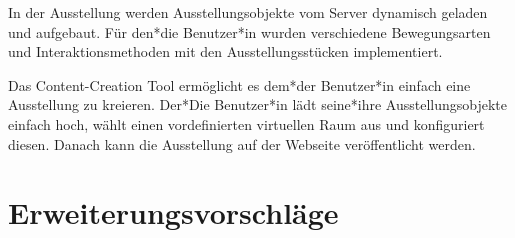 In der Ausstellung werden Ausstellungsobjekte vom Server dynamisch geladen und aufgebaut. Für den*die Benutzer*in wurden verschiedene Bewegungsarten und Interaktionsmethoden mit den Ausstellungsstücken implementiert.

Das Content-Creation Tool ermöglicht es dem*der Benutzer*in einfach eine Ausstellung zu kreieren. Der*Die Benutzer*in lädt seine*ihre Ausstellungsobjekte einfach hoch, wählt einen vordefinierten virtuellen Raum aus und konfiguriert diesen. Danach kann die Ausstellung auf der Webseite veröffentlicht werden.

\section{Erweiterungsvorschläge} 

